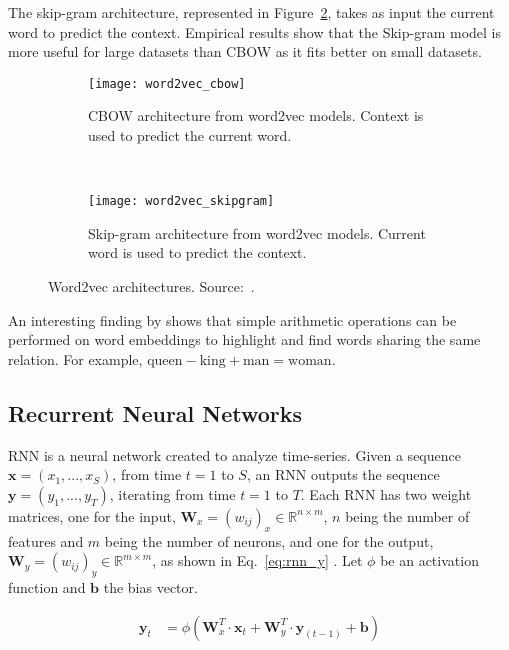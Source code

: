 The skip-gram architecture, represented in Figure~\ref{fig:skipgram}, takes as input the current word to predict the context. Empirical results \citep{tf.word2vec} show that the Skip-gram model is more useful for large datasets than CBOW as it fits better on small datasets.

\begin{figure}
    \centering
    \begin{subfigure}{.45\textwidth}
        \centering
        \texttt{[image: word2vec\_cbow]}
        \caption[Continuous Bag-of-Words architecture]{CBOW architecture from word2vec models. Context is used to predict the current word.}
        \label{fig:cbow}
    \end{subfigure}
    ~~~~~~~~~~
    \begin{subfigure}{.45\textwidth}
        \centering
        \texttt{[image: word2vec\_skipgram]}
        \caption[Skip-gram architecture]{Skip-gram architecture from word2vec models. Current word is used to predict the context.}
        \label{fig:skipgram}
    \end{subfigure}
    \decoRule
    \caption[Word2vec architectures]{Word2vec architectures. Source:~\citet{1301.3781}.}
    \label{fig:word2vec}
\end{figure}

An interesting finding by \citet{1301.3781} shows that simple arithmetic operations can be performed on word embeddings to highlight and find words sharing the same relation. For example, $\mathrm{queen} - \mathrm{king} + \mathrm{man} = \mathrm{woman}$.

\subsection{Recurrent Neural Networks}
RNN is a neural network created to analyze time-series. Given a sequence $\bm{x} = (x_1, ..., x_S)$, from time $t = 1$ to $S$, an RNN outputs the sequence $\bm{y} = (y_1, ..., y_T)$, iterating from time $t = 1$ to $T$.
Each RNN has two weight matrices, one for the input, $\mathbf{W}_x = (w_{ij})_x \in \mathbb{R}^{n \times m}$, $n$ being the number of features and $m$ being the number of neurons, and one for the output, $\mathbf{W}_y = (w_{ij})_y \in \mathbb{R}^{m \times m}$, as shown in Eq.~\ref{eq:rnn_y} \citep{geron2017hands}.
Let $\phi$ be an activation function and $\bm{b}$ the bias vector.

\begin{align}
    \label{eq:rnn_y}
    \bm{y}_t &= \phi (\mathbf{W}_x^T \cdot \bm{x}_t + \mathbf{W}_y^T \cdot \bm{y}_{(t-1)} + \bm{b})
\end{align}

